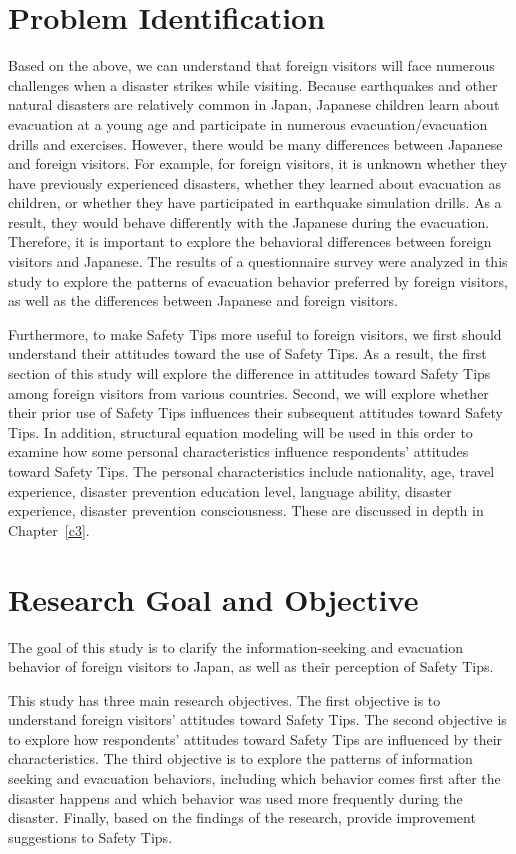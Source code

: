 \section{Problem Identification}
Based on the above, we can understand that foreign visitors will face numerous challenges when a disaster strikes while visiting. Because earthquakes and other natural disasters are relatively common in Japan, Japanese children learn about evacuation at a young age and participate in numerous evacuation/evacuation drills and exercises. However, there would be many differences between Japanese and foreign visitors. For example, for foreign visitors, it is unknown whether they have previously experienced disasters, whether they learned about evacuation as children, or whether they have participated in earthquake simulation drills. As a result, they would behave differently with the Japanese during the evacuation. Therefore, it is important to explore the behavioral differences between foreign visitors and Japanese. The results of a questionnaire survey were analyzed in this study to explore the patterns of evacuation behavior preferred by foreign visitors, as well as the differences between Japanese and foreign visitors.

Furthermore, to make Safety Tips more useful to foreign visitors, we first should understand their attitudes toward the use of Safety Tips. As a result, the first section of this study will explore the difference in attitudes toward Safety Tips among foreign visitors from various countries. Second, we will explore whether their prior use of Safety Tips influences their subsequent attitudes toward Safety Tips. In addition, structural equation modeling will be used in this order to examine how some personal characteristics influence respondents' attitudes toward Safety Tips. The personal characteristics include nationality, age, travel experience, disaster prevention education level, language ability, disaster experience, disaster prevention consciousness. These are discussed in depth in Chapter~\ref{c3}.

\section{Research Goal and Objective}
The goal of this study is to clarify the information-seeking and evacuation behavior of foreign visitors to Japan, as well as their perception of Safety Tips. 

This study has three main research objectives. The first objective is to understand foreign visitors' attitudes toward Safety Tips. The second objective is to explore how respondents' attitudes toward Safety Tips are influenced by their characteristics. The third objective is to explore the patterns of information seeking and evacuation behaviors, including which behavior comes first after the disaster happens and which behavior was used more frequently during the disaster. Finally, based on the findings of the research, provide improvement suggestions to Safety Tips.


